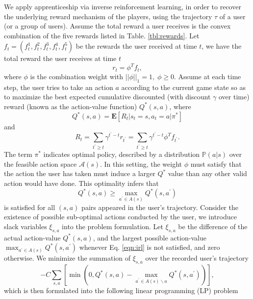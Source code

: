 \documentclass[a4paper]{article}
\begin{document}
We apply apprenticeship via inverse reinforcement learning, in order to recover the underlying reward mechanism of the players, using the trajectory $\tau$ of a user (or a group of users). Assume the total reward a user receives is the convex combination of the five rewards listed in Table. \ref{tbl:rewards}. Let $f_t=(f_t^1,f_t^2,f_t^3,f_t^4,f_t^5)$ be the rewards the user received at time $t$, we have the total reward the user receives at time $t$ $$r_t=\phi^Tf_t,$$ 
where $\phi$ is the combination weight with $||\phi||_1=1, \; \phi \geq 0$. Assume at each time step, the user tries to take an action $a$ according to the current game state so as to maximize the best expected cumulative discounted (with discount $\gamma$ over time) reward (known as the action-value function) $Q^\ast(s, a)$, where
$$Q^\ast(s,a)=\mathbf{E}[R_t | s_{t}=s, a_{t}=a | \pi^\ast]$$
and
$$R_t=\sum_{t^\prime\geq t}\gamma^{t^\prime-t}r_{t^\prime}=\sum_{t^\prime\geq t}\gamma^{t^\prime-t}\phi^Tf_{t^\prime}.$$
The term $\pi^\ast$ indicates optimal policy, described by a distribution $\mathbb{P}(a|s)$ over the feasible action space $\mathcal{A}(s)$. In this setting, the weight $\phi$ must satisfy that the action the user has taken must induce a larger $Q^\ast$ value than any other valid action would have done. This optimality infers that
\begin{equation}
Q^\ast(s,a) \geq \max_{a^\prime \in A(s)}Q^\ast(s,a^\prime) \label{eqn:irl}
\end{equation}
is satisfied for all $(s,a)$ pairs appeared in the user's trajectory. Consider the existence of possible sub-optimal actions conducted by the user, we introduce slack variables $\xi_{s,a}$ into the problem formulation. Let $\xi_{s,a}$ be the difference of the actual action-value $Q^\ast(s,a)$, and the largest possible action-value $\max_{a^\prime \in A(s)}Q^\ast(s,a^\prime)$ whenever Eq. \eqref{eqn:irl} is not satisfied, and zero otherwise. We minimize the summation of $\xi_{s,a}$ over the recorded user's trajectory
\begin{equation}
-C\sum_{s,a} \left[\min(0, Q^\ast(s,a) - \max_{a^\prime \in A(s)\backslash a}Q^\ast(s,a^\prime))\right], \label{eqn:slack}
\end{equation}
which is then formulated into the following linear programming (LP) problem
\end{document}

